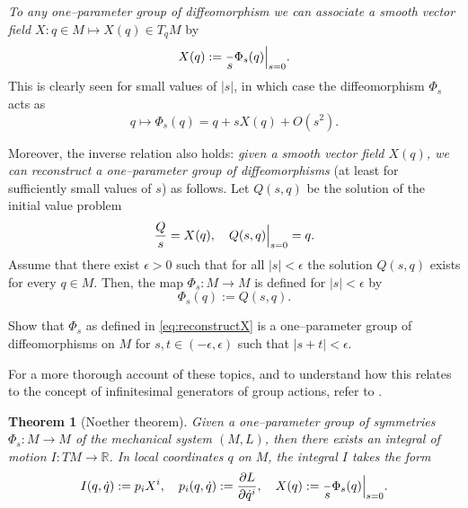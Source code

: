 \documentclass[english,fontsize=11pt,paper=a5,oneside]{scrbook}
\newcommand{\R}{\mathbb{R}}
\let\d\relax
\DeclareMathOperator{\d}{d}
\newtheorem{theorem}{Theorem}[chapter]
\theoremstyle{definition}
\newenvironment{remark}
  {\pushQED{\qed}\renewcommand{\qedsymbol}{$\lozenge$}\remarkx}
  {\popQED\endremarkx}
\newenvironment{exercise}
  {\pushQED{\qed}\renewcommand{\qedsymbol}{$\maltese$}\exercisex}
  {\popQED\endexercisex}
\begin{document}
\begin{remark}
\emph{To any one--parameter group of diffeomorphism we can associate a smooth vector field $X : q\in M \mapsto X(q)\in T_qM$} by
\begin{equation}
    X(q) := \frac{\d}{\d s} \Phi_s(q) \Big|_{s=0}.
\end{equation}
This is clearly seen for small values of $|s|$, in which case the diffeomorphism $\Phi_s$ acts as
\begin{equation}\label{eq:infinitesimalSymmetryExp}
    q \mapsto \Phi_s(q) = q + s X(q) + O(s^2).
\end{equation}

Moreover, the inverse relation also holds: \emph{given a smooth vector field $X(q)$, we can reconstruct a one--parameter group of diffeomorphisms} (at least for sufficiently small values of $s$) as follows.
Let $Q(s, q)$ be the solution of the initial value problem
\begin{equation}\label{eq:NoetherCoords}
    \frac{\d Q}{\d s} = X(q), \quad Q(s, q)\Big|_{s=0} = q.
\end{equation}
Assume that there exist $\epsilon >0$ such that for all $|s|<\epsilon$ the solution $Q(s,q)$ exists for every $q\in M$.
Then, the map $\Phi_s:M\to M$ is defined for $|s|<\epsilon$ by 
\begin{equation}\label{eq:reconstructX}
    \Phi_s(q) := Q(s, q).
\end{equation}

\begin{exercise}
    Show that $\Phi_s$ as defined in \eqref{eq:reconstructX} is a one--parameter group of diffeomorphisms on $M$ for $s,t \in(-\epsilon,\epsilon)$ such that $|s + t| < \epsilon$.
\end{exercise}

For a more thorough account of these topics, and to understand how this relates to the concept of infinitesimal generators of group actions, refer to \cite[Chapters 9 and 20]{book:lee}.
\end{remark}

\begin{theorem}[Noether theorem]\label{thm:noether}
    Given a one--parameter group of symmetries $\Phi_s: M \to M$ of the mechanical system $(M,L)$, then there exists an integral of motion $I: TM \to \R$.
    In local coordinates $q$ on $M$, the integral $I$ takes the form
    \begin{equation}
        I(q,\dot q) := p_i X^i,
        \quad p_i(q, \dot q) := \frac{\partial L}{\partial \dot q^i},
        \quad X(q) := \frac{\d}{\d s} \Phi_s(q) \Big|_{s=0}.
    \end{equation}
\end{theorem}
\end{document}
